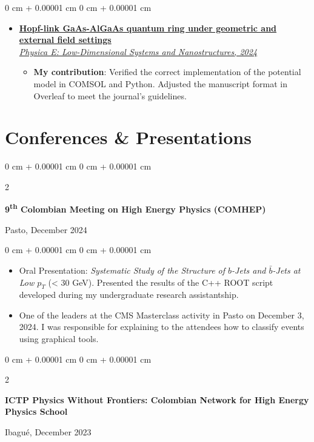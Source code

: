 \documentclass[10pt, letterpaper]{article}
\newenvironment{highlights}{
    \begin{itemize}[
        topsep=0.10 cm,
        parsep=0.10 cm,
        partopsep=0pt,
        itemsep=0pt,
        leftmargin=0 cm + 10pt
    ]
}{
    \end{itemize}
}
\newenvironment{onecolentry}{
    \begin{adjustwidth}{
        0 cm + 0.00001 cm
    }{
        0 cm + 0.00001 cm
    }
}{
    \end{adjustwidth}
}
\newenvironment{twocolentry}[2][]{
    \onecolentry
    \def\secondColumn{#2}
    \setcolumnwidth{\fill, 4.5 cm}
    \begin{paracol}{2}
}{
    \switchcolumn \raggedleft \secondColumn
    \end{paracol}
    \endonecolentry
}
\begin{document}
\begin{onecolentry}
\begin{highlights}
\begin{itemize}
                \item \href{https://doi.org/10.1016/j.physe.2024.116032}{\textbf{Hopf-link GaAs-AlGaAs quantum ring under geometric and external field settings} \\ \textit{Physica E: Low-Dimensional Systems and Nanostructures, 2024}}
                \begin{itemize}
                    \item \textbf{My contribution}: Verified the correct implementation of the potential model in COMSOL and Python. Adjusted the manuscript format in Overleaf to meet the journal’s guidelines.
                \end{itemize}
            \end{itemize}
        \end{highlights}
    \end{onecolentry}

    \vspace{0.5 cm}
    \section{Conferences \& Presentations}
    \begin{twocolentry}{
        Pasto, December 2024
    }
        \textbf{9\textsuperscript{th} Colombian Meeting on High Energy Physics (COMHEP)}
    \end{twocolentry}

    \vspace{0.10 cm}
    \begin{onecolentry}
        \begin{highlights}
            \item Oral Presentation: \textit{Systematic Study of the Structure of \(b\)-Jets and \(\bar{b}\)-Jets at Low \(p_T\)} (< 30 GeV). Presented the results of the C++ ROOT script developed during my undergraduate research assistantship.
            \item One of the leaders at the CMS Masterclass activity in Pasto on December 3, 2024. I was responsible for explaining to the attendees how to classify events using graphical tools.
        \end{highlights}
    \end{onecolentry}

    \vspace{0.2 cm}
    \begin{twocolentry}{
        Ibagué, December 2023
    }
        \textbf{ICTP Physics Without Frontiers: Colombian Network for High Energy Physics School}
    \end{twocolentry}
\end{document}
